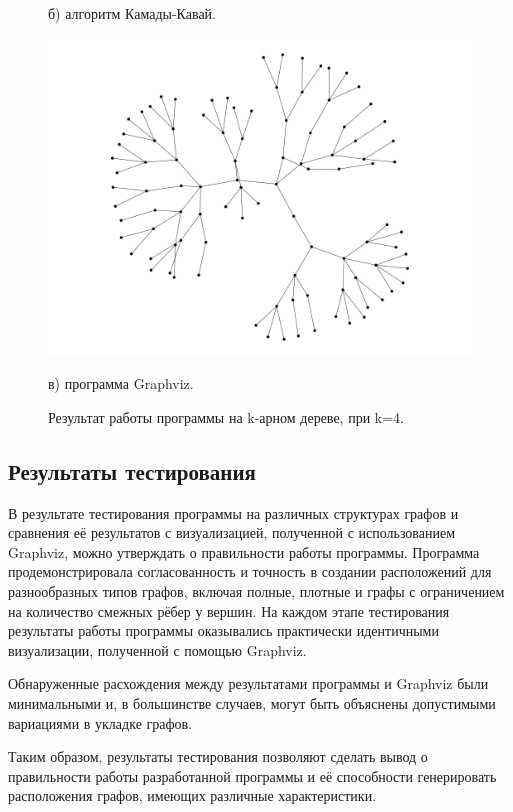 \documentclass[14pt, russian]{scrartcl}
\begin{document}
\begin{figure}[H]
\begin{minipage}[t]{.50\textwidth}
		\caption*{б) алгоритм Камады-Кавай.}
	\end{minipage}
	\begin{minipage}[t]{.55\textwidth}
		\centering
		\includegraphics[width=\linewidth]{./imgs/quad_tree_gv.png}
		\caption*{в) программа Graphviz.}
	\end{minipage}
	\caption{Результат работы программы на k-арном дереве, при k=4.}
	\label{fig:quad_tree_res}
\end{figure}


\subsection{Результаты тестирования}

В результате тестирования программы на различных структурах графов и сравнения её результатов с визуализацией, полученной с использованием Graphviz, можно утверждать о правильности работы программы. Программа продемонстрировала согласованность и точность в создании расположений для разнообразных типов графов, включая полные, плотные и графы с ограничением на количество смежных рёбер у вершин. На каждом этапе тестирования результаты работы программы оказывались практически идентичными визуализации, полученной с помощью Graphviz.

Обнаруженные расхождения между результатами программы и Graphviz были минимальными и, в большинстве случаев, могут быть объяснены допустимыми вариациями в укладке графов.

Таким образом, результаты тестирования позволяют сделать вывод о правильности работы разработанной программы и её способности генерировать расположения графов, имеющих различные характеристики.
\end{document}
